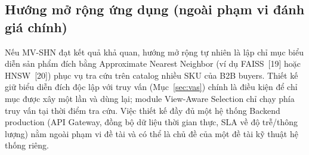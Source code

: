 \documentclass[a4paper]{article}
\begin{document}
\subsection{Hướng mở rộng ứng dụng (ngoài phạm vi đánh giá chính)}\label{sec:ext}
Nếu MV-SHN đạt kết quả khả quan, hướng mở rộng tự nhiên là lập chỉ mục biểu diễn sản phẩm đích bằng Approximate Nearest Neighbor (ví dụ FAISS~[19] hoặc HNSW~[20]) phục vụ tra cứu trên catalog nhiều SKU của B2B buyers. Thiết kế giữ biểu diễn đích độc lập với truy vấn (Mục~\ref{sec:vas}) chính là điều kiện để chỉ mục được xây một lần và dùng lại; module View-Aware Selection chỉ chạy phía truy vấn tại thời điểm tra cứu. Việc thiết kế đầy đủ một hệ thống Backend production (API Gateway, đồng bộ dữ liệu thời gian thực, SLA về độ trễ/thông lượng) nằm ngoài phạm vi đề tài và có thể là chủ đề của một đề tài kỹ thuật hệ thống riêng.

\end{document}
